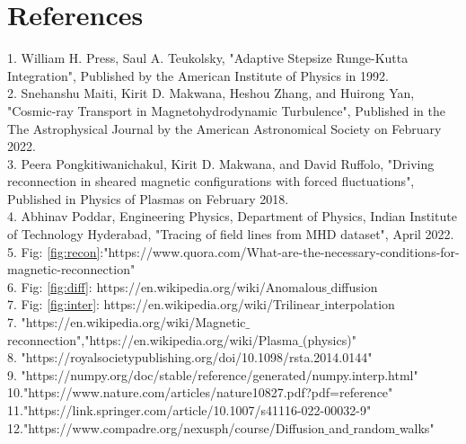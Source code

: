 \documentclass[fleqn]{report}
\begin{document}
	\chapter{References}
	1. William H. Press, Saul A. Teukolsky, "Adaptive Stepsize Runge-Kutta Integration", Published by the American Institute of Physics in 1992.\\  
	2. Snehanshu Maiti, Kirit D. Makwana, Heshou Zhang, and Huirong Yan, "Cosmic-ray Transport in Magnetohydrodynamic Turbulence", Published in the The Astrophysical Journal by the American Astronomical Society on February 2022.\\
	3. Peera Pongkitiwanichakul, Kirit D. Makwana, and David Ruffolo, "Driving reconnection in sheared magnetic configurations with forced fluctuations", Published in Physics of Plasmas on February 2018.\\
	4. Abhinav Poddar, Engineering Physics, Department of Physics, Indian Institute of Technology Hyderabad, "Tracing of field lines from MHD dataset", April 2022.\\
	5. Fig: \ref{fig:recon}:"https://www.quora.com/What-are-the-necessary-conditions-for-magnetic-reconnection"\\
	6. Fig: \ref{fig:diff}: https://en.wikipedia.org/wiki/Anomalous$\_$diffusion\\
	7. Fig: \ref{fig:inter}: https://en.wikipedia.org/wiki/Trilinear$\_$interpolation\\
	7. "https://en.wikipedia.org/wiki/Magnetic$\_$reconnection","https://en.wikipedia.org/wiki/Plasma$\_$(physics)"\\
	8. "https://royalsocietypublishing.org/doi/10.1098/rsta.2014.0144"\\
	9. "https://numpy.org/doc/stable/reference/generated/numpy.interp.html"\\
	10."https://www.nature.com/articles/nature10827.pdf?pdf=reference"\\
	11."https://link.springer.com/article/10.1007/s41116-022-00032-9"\\
	12."https://www.compadre.org/nexusph/course/Diffusion$\_$and$\_$random$\_$walks"
	
\end{document}
